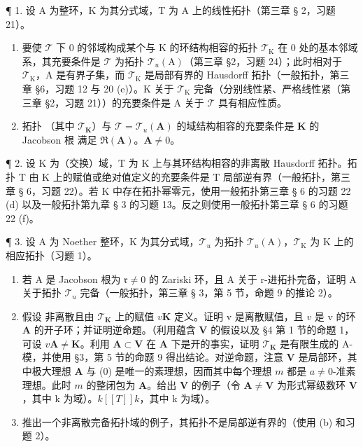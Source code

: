 
¶ 1. 设 A 为整环，K 为其分式域，T 为 A 上的线性拓扑（第三章 § 2，习题 21）。

\begin{enumerate}
\def\labelenumi{(\alph{enumi})}
\item
  要使 \(\mathcal{T}\) 下 0 的邻域构成某个与 K 的环结构相容的拓扑 \(\mathcal{T}_{\mathrm{K}}\) 在 0 处的基本邻域系，其充要条件是 \(\mathcal{T}\) 为拓扑 \(\mathcal{T}_{u}(\mathrm{A})\)（第三章 §2，习题 24）；此时相对于 \(\mathcal{T}_{\mathrm{K}}\)，A 是有界子集，而 \(\mathcal{T}_{\mathrm{K}}\) 是局部有界的 Hausdorff 拓扑（一般拓扑，第三章 §6，习题 12 与 20 (e)）。K 关于 \(\mathcal{T}_{\mathrm{K}}\) 完备（分别线性紧、严格线性紧（第三章 §2，习题 21））的充要条件是 A 关于 \(\mathcal{T}\) 具有相应性质。
\item
  拓扑 （其中 \(\mathcal{T}_{\mathbf{K}}\)）与 \(\mathcal{T} = \mathcal{T}_u(\mathbf{A})\) 的域结构相容的充要条件是 \(\mathbf{K}\) 的 Jacobson 根  满足 \(\Re(\mathbf{A})\)。\(\mathbf{A}\)\(\neq 0\)。
\end{enumerate}

¶ 2. 设 K 为（交换）域，T 为 K 上与其环结构相容的非离散 Hausdorff 拓扑。拓扑 T 由 K 上的赋值或绝对值定义的充要条件是 T 局部逆有界（一般拓扑，第三章 § 6，习题 22）。若 K 中存在拓扑幂零元，使用一般拓扑第三章 § 6 的习题 22 (d) 以及一般拓扑第九章 § 3 的习题 13。反之则使用一般拓扑第三章 § 6 的习题 22 (f)。

¶ 3. 设 A 为 Noether 整环，K 为其分式域，\(\mathcal{T}_{u}\) 为拓扑 \(\mathcal{T}_{u}(\mathrm{A})\)，\(\mathcal{T}_{\mathrm{K}}\) 为 K 上的相应拓扑（习题 1）。

\begin{enumerate}
\def\labelenumi{(\alph{enumi})}
\item
  若 A 是 Jacobson 根为 \(\mathfrak{r} \neq 0\) 的 Zariski 环，且 A 关于 r-进拓扑完备，证明 A 关于拓扑 \(\mathcal{T}_u\) 完备（一般拓扑，第三章 § 3，第 5 节，命题 9 的推论 2）。
\item
  假设  非离散且由 \(\mathcal{T}_{\mathbf{K}}\) 上的赋值 \(v\)\(\mathbf{K}\) 定义。证明 v 是离散赋值，且 \(v\) 是 v 的环 \(\mathbf{A}\) 的开子环；并证明逆命题。（利用蕴含 \(\mathbf{V}\) 的假设以及 §4 第 1 节的命题 1，可设 \(v\)\(\mathbf{A} \neq \mathbf{K}\)。利用 \(\mathbf{A} \subset \mathbf{V}\) 在 \(\mathbf{A}\) 下是开的事实，证明 \(\mathcal{T}_{\mathbf{K}}\) 是有限生成的 A-模，并使用 §3，第 5 节的命题 9 得出结论。对逆命题，注意 \(\mathbf{V}\) 是局部环，其中极大理想 \(\mathbf{A}\) 与 (0) 是唯一的素理想，因而其中每个理想 \(m\) 都是 \(a \neq 0\)-准素理想。此时 \(m\) 的整闭包为 \(\mathbf{A}\)。给出 \(\mathbf{V}\) 的例子（令 \(\mathbf{A} \neq \mathbf{V}\) 为形式幂级数环 \(\mathbf{V}\)，其中 k 为域）。\(k[[T]]\)\(k\)，其中 k 为域）。
\item
  推出一个非离散完备拓扑域的例子，其拓扑不是局部逆有界的（使用 (b) 和习题 2）。
\end{enumerate}

